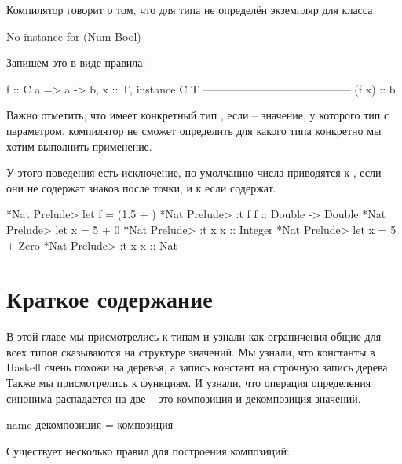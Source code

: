 Компилятор говорит о том, что для типа  не  
определён экземпляр для класса 

\begin{code}
No instance for (Num Bool) 
\end{code}

Запишем это в виде правила:

\begin{code}
                    f :: C a => a -> b,  x :: T, instance C T 
                    -----------------------------------------
                                (f x) :: b
\end{code}

Важно отметить, что  имеет конкретный тип , 
если  -- значение, у которого тип с параметром, компилятор не сможет
определить для какого типа конкретно мы хотим выполнить применение. 

У этого поведения есть исключение, по умолчанию 
числа приводятся к , если они не содержат знаков после точки,
и к  если содержат.

\begin{code}
*Nat Prelude> let f = (1.5 + )
*Nat Prelude> :t f
f :: Double -> Double
*Nat Prelude> let x = 5 + 0
*Nat Prelude> :t x
x :: Integer
*Nat Prelude> let x = 5 + Zero
*Nat Prelude> :t x
x :: Nat
\end{code}


\section{Краткое содержание}

В этой главе мы присмотрелись к типам и узнали
как ограничения общие для всех типов сказываются на 
структуре значений. Мы узнали, что константы в Haskell 
очень похожи на деревья, а запись 
констант на строчную запись дерева. Также мы присмотрелись
к функциям. И узнали, что операция определения синонима 
распадается на две -- это композиция и декомпозиция значений.

\begin{code}
name   декомпозиция   =   композиция
\end{code}


Существует несколько правил для построения композиций:

